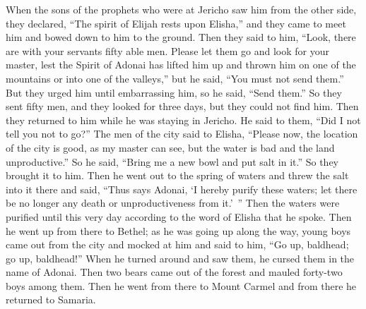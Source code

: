 \begin{biblechapter}
 When the sons of the prophets who were at Jericho saw him from the other side, they declared, “The spirit of Elijah rests upon Elisha,” and they came to meet him and bowed down to him to the ground.
\verse Then they said to him, “Look, there are with your servants fifty able men. Please let them go and look for your master, lest the Spirit of Adonai has lifted him up and thrown him on one of the mountains or into one of the valleys,” but he said, “You must not send them.”
\verse But they urged him until embarrassing him, so he said, “Send them.” So they sent fifty men, and they looked for three days, but they could not find him.
\verse Then they returned to him while he was staying in Jericho. He said to them, “Did I not tell you not to go?”
\verse The men of the city said to Elisha, “Please now, the location of the city is good, as my master can see, but the water is bad and the land unproductive.”
\verse So he said, “Bring me a new bowl and put salt in it.” So they brought it to him.
\verse Then he went out to the spring of waters and threw the salt into it there and said, “Thus says Adonai, ‘I hereby purify these waters; let there be no longer any death or unproductiveness from it.’ ”
\verse Then the waters were purified until this very day according to the word of Elisha that he spoke.
\verse Then he went up from there to Bethel; as he was going up along the way, young boys came out from the city and mocked at him and said to him, “Go up, baldhead; go up, baldhead!”
\verse When he turned around and saw them, he cursed them in the name of Adonai. Then two bears came out of the forest and mauled forty-two boys among them.
\verse Then he went from there to Mount Carmel and from there he returned to Samaria.
\end{biblechapter}

